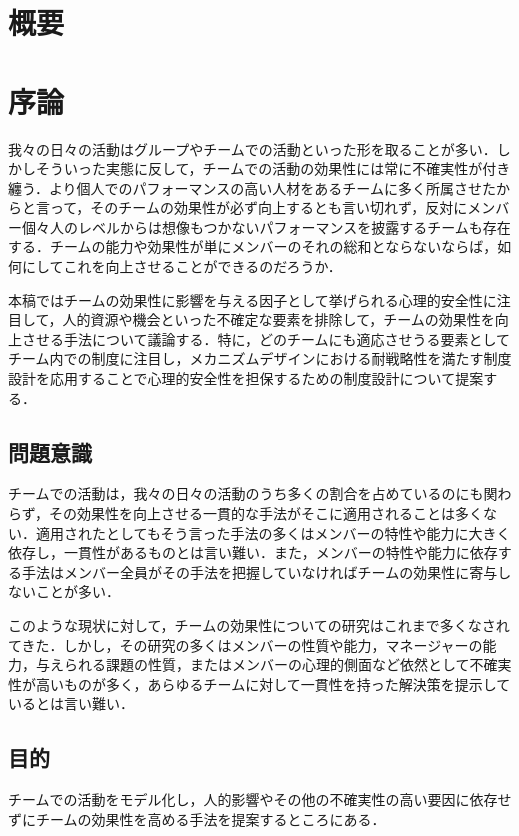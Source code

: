 \documentclass[a4paper, 11pt]{jsarticle}
\begin{document}
\maketitle

\hspace{0pt}
\vfill
\tableofcontents
\thispagestyle{empty}
\vfill
\hspace{0pt}
\newpage
\section*{概要}
\section{序論}
我々の日々の活動はグループやチームでの活動といった形を取ることが多い．しかしそういった実態に反して，チームでの活動の効果性には常に不確実性が付き纏う．より個人でのパフォーマンスの高い人材をあるチームに多く所属させたからと言って，そのチームの効果性が必ず向上するとも言い切れず，反対にメンバー個々人のレベルからは想像もつかないパフォーマンスを披露するチームも存在する．チームの能力や効果性が単にメンバーのそれの総和とならないならば，如何にしてこれを向上させることができるのだろうか．

本稿ではチームの効果性に影響を与える因子として挙げられる心理的安全性に注目して，人的資源や機会といった不確定な要素を排除して，チームの効果性を向上させる手法について議論する．特に，どのチームにも適応させうる要素としてチーム内での制度に注目し，メカニズムデザインにおける耐戦略性を満たす制度設計を応用することで心理的安全性を担保するための制度設計について提案する．
\subsection{問題意識}
チームでの活動は，我々の日々の活動のうち多くの割合を占めているのにも関わらず，その効果性を向上させる一貫的な手法がそこに適用されることは多くない．適用されたとしてもそう言った手法の多くはメンバーの特性や能力に大きく依存し，一貫性があるものとは言い難い．また，メンバーの特性や能力に依存する手法はメンバー全員がその手法を把握していなければチームの効果性に寄与しないことが多い．

このような現状に対して，チームの効果性についての研究はこれまで多くなされてきた．しかし，その研究の多くはメンバーの性質や能力，マネージャーの能力，与えられる課題の性質，またはメンバーの心理的側面など依然として不確実性が高いものが多く，あらゆるチームに対して一貫性を持った解決策を提示しているとは言い難い．
\subsection{目的}
チームでの活動をモデル化し，人的影響やその他の不確実性の高い要因に依存せずにチームの効果性を高める手法を提案するところにある．
\end{document}
